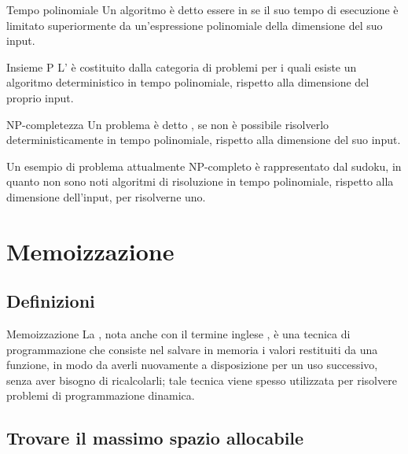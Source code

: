 \documentclass[a4paper, 12pt]{report}
\begin{document}
    \begin{frameddefn}{Tempo polinomiale}
        Un algoritmo è detto essere in  se il suo tempo di esecuzione è limitato superiormente da un'espressione polinomiale della dimensione del suo input.
    \end{frameddefn}

    \begin{frameddefn}{Insieme P}
        L' è costituito dalla categoria di problemi per i quali esiste un algoritmo deterministico in tempo polinomiale, rispetto alla dimensione del proprio input.
    \end{frameddefn}

    \begin{frameddefn}{NP-completezza}
        Un problema è detto , se non è possibile risolverlo deterministicamente in tempo polinomiale, rispetto alla dimensione del suo input.
    \end{frameddefn}

    \begin{example}
        Un esempio di problema attualmente NP-completo è rappresentato dal sudoku, in quanto non sono noti algoritmi di risoluzione in tempo polinomiale, rispetto alla dimensione dell'input, per risolverne uno.
    \end{example}

    \section{Memoizzazione}

    \subsection{Definizioni}

    \begin{frameddefn}{Memoizzazione}
        La , nota anche con il termine inglese , è una tecnica di programmazione che consiste nel salvare in memoria i valori restituiti da una funzione, in modo da averli nuovamente a disposizione per un uso successivo, senza aver bisogno di ricalcolarli; tale tecnica viene spesso utilizzata per risolvere problemi di programmazione dinamica.
    \end{frameddefn}

    \subsection{Trovare il massimo spazio allocabile}
\end{document}
